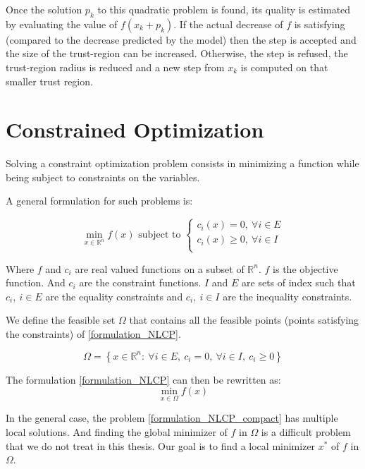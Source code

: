 Once the solution $p_k$ to this quadratic problem is found, its quality is
estimated by evaluating the value of $f(x_k+p_k)$. If the actual decrease of $f$
is satisfying (compared to the decrease predicted by the model) then the step is
accepted and the size of the trust-region can be increased. Otherwise, the step
is refused, the trust-region radius is reduced and a new step from $x_k$ is
computed on that smaller trust region.

\section{Constrained Optimization}

Solving a constraint optimization problem consists in minimizing a function while being subject to constraints on the variables.

A general formulation for such problems is:

\begin{equation}
  \label{formulation_NLCP}
  \min_{x\in\mathbb{R}^n}{f(x)} \text{ subject to }
  \left\{
  \begin{array}{l}
    c_i(x) = 0,\ \forall i\in{E}\\
    c_i(x) \geq 0,\ \forall i\in{I}\\
  \end{array}
  \right.
\end{equation}


Where $f$ and $c_i$ are real valued functions on a subset of $\mathbb{R}^n$.
$f$ is the objective function. And $c_i$ are the constraint functions.
${I}$ and ${E}$ are sets of index such that $c_i,\ i\in{E}$ are the equality constraints and $c_i,\ i\in{I}$ are the inequality constraints.

We define the feasible set $\Omega$ that contains all the feasible points (points satisfying the constraints) of \ref{formulation_NLCP}.

\begin{equation}
  \Omega = \left\{ x\in \mathbb{R}^n:\ \forall i\in {E},\ c_i=0,\ \forall i\in{I},\ c_i \geq0\right\}
\end{equation}

The formulation \ref{formulation_NLCP} can then be rewritten as:
\begin{equation}
  \label{formulation_NLCP_compact}
  \min_{x\in\Omega}{f(x)}
\end{equation}

In the general case, the problem \ref{formulation_NLCP_compact} has multiple local solutions.
And finding the global minimizer of $f$ in $\Omega$ is a difficult problem that we do not treat in this thesis.
Our goal is to find a local minimizer $x^*$ of $f$ in $\Omega$.

